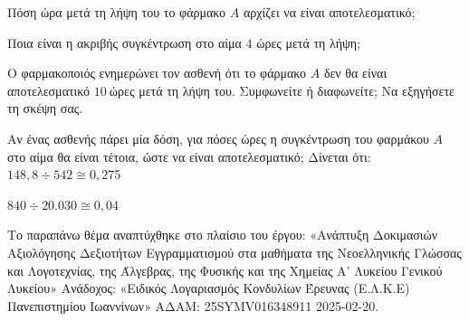 \begin{alist}
\item

\begin{rlist}
\item Πόση ώρα μετά τη λήψη του το φάρμακο $A$ αρχίζει να είναι αποτελεσματικό;
\item Ποια είναι η ακριβής συγκέντρωση στο αίμα $4$ ώρες μετά τη λήψη;
\end{rlist}
\item

\begin{rlist}
\item Ο φαρμακοποιός ενημερώνει τον ασθενή ότι το φάρμακο $A$ δεν θα είναι αποτελεσματικό $10\ $ώρες μετά τη λήψη του. Συμφωνείτε ή διαφωνείτε; Να εξηγήσετε τη σκέψη σας.
\item Αν ένας ασθενής πάρει μία δόση, για πόσες ώρες η συγκέντρωση του φαρμάκου $A$ στο αίμα θα είναι τέτοια, ώστε να είναι αποτελεσματικό;
Δίνεται ότι: $148,8 \div 542 \cong 0,27$5

$840 \div 20.030 \cong 0,04$

{\footnotesize Το παραπάνω θέμα αναπτύχθηκε στο πλαίσιο του έργου: «Ανάπτυξη Δοκιμασιών Αξιολόγησης Δεξιοτήτων Εγγραμματισμού στα μαθήματα της Νεοελληνικής Γλώσσας και Λογοτεχνίας, της Άλγεβρας, της Φυσικής και της Χημείας Α' Λυκείου Γενικού Λυκείου» Ανάδοχος: «Ειδικός Λογαριασμός Κονδυλίων Έρευνας (Ε.Λ.Κ.Ε) Πανεπιστημίου Ιωαννίνων» ΑΔΑΜ: 25SYMV016348911 2025-02-20.}
\end{rlist}
\end{alist}

